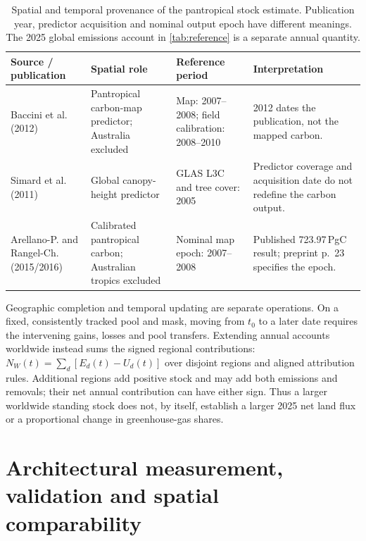 \documentclass[11pt,a4paper]{article}
\theoremstyle{remark}
\begin{document}
\begin{table}[htbp]
\centering\small
\caption{Spatial and temporal provenance of the pantropical stock estimate. Publication year, predictor acquisition and nominal output epoch have different meanings. The 2025 global emissions account in \cref{tab:reference} is a separate annual quantity.}
\label{tab:scopeprovenance}
\begin{tabularx}{\textwidth}{@{}>{\raggedright\arraybackslash}p{}>{\raggedright\arraybackslash}p{}>{\raggedright\arraybackslash}p{}Y@{}}
\toprule
Source / publication & Spatial role & Reference period & Interpretation\\
\midrule
Baccini et al. (2012) & Pantropical carbon-map predictor; Australia excluded & Map: 2007--2008; field calibration: 2008--2010 & 2012 dates the publication, not the mapped carbon.\\[.5em]
Simard et al. (2011) & Global canopy-height predictor & GLAS L3C and tree cover: 2005 & Predictor coverage and acquisition date do not redefine the carbon output.\\[.5em]
Arellano-P. and Rangel-Ch. (2015/2016) & Calibrated pantropical carbon; Australian tropics excluded & Nominal map epoch: 2007--2008 & Published 723.97\,PgC result; preprint p.~23 specifies the epoch.\\
\bottomrule
\end{tabularx}
\end{table}

Geographic completion and temporal updating are separate operations. On a fixed, consistently tracked pool and mask, moving from $t_0$ to a later date requires the intervening gains, losses and pool transfers. Extending annual accounts worldwide instead sums the signed regional contributions: $N_W(t)=\sum_d[E_d(t)-U_d(t)]$ over disjoint regions and aligned attribution rules. Additional regions add positive stock and may add both emissions and removals; their net annual contribution can have either sign. Thus a larger worldwide standing stock does not, by itself, establish a larger 2025 net land flux or a proportional change in greenhouse-gas shares.

\section{Architectural measurement, validation and spatial comparability}
\end{document}
